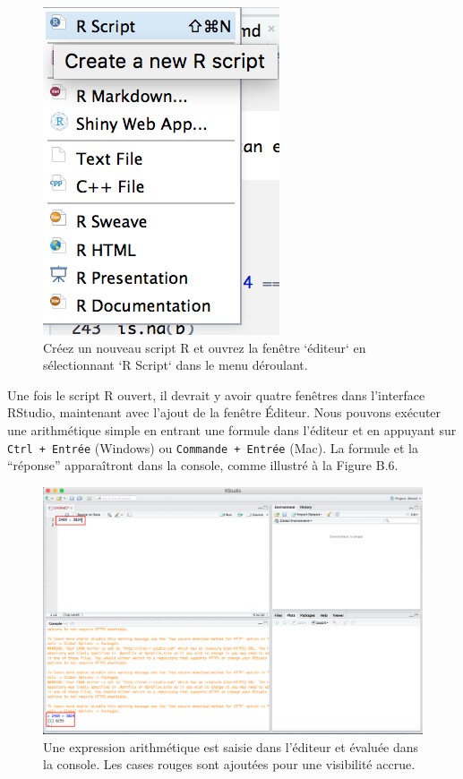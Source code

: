 \documentclass[12pt,]{book}
\begin{document}
\begin{figure}
\includegraphics[width=0.6\linewidth]{Images/new_script} \caption{Créez un nouveau script R et ouvrez la fenêtre `éditeur` en sélectionnant `R Script` dans le menu déroulant.}\label{fig:newscript}
\end{figure}

Une fois le script R ouvert, il devrait y avoir quatre fenêtres dans l'interface RStudio, maintenant avec l'ajout de la fenêtre Éditeur. Nous pouvons exécuter une arithmétique simple en entrant une formule dans l'éditeur et en appuyant sur \texttt{Ctrl\ +\ Entrée} (Windows) ou \texttt{Commande\ +\ Entrée} (Mac). La formule et la ``réponse'' apparaîtront dans la console, comme illustré à la Figure B.6.

\begin{figure}
\includegraphics[width=0.6\linewidth]{Images/first_addition} \caption{Une expression arithmétique est saisie dans l'éditeur et évaluée dans la console. Les cases rouges sont ajoutées pour une visibilité accrue.}\label{fig:firstaddition}
\end{figure}
\end{document}
